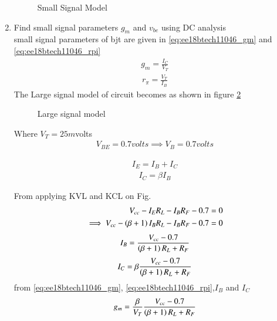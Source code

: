 \begin{enumerate}[label=\arabic*.,ref=\theenumi]
\begin{figure}[ht!]
	\begin{center}
		\resizebox{\columnwidth}{!}{}
	\end{center}
	\caption{Small Signal Model}
	\label{fig:ee18btech11046_smallSig}
\end{figure}
\renewcommand{\thefigure}{\theenumi}
%
\item Find small signal parameters 
 $g_{m}$ and $v_{be}$ using DC analysis
\\
%
\solution
small signal parameters of bjt are given in
\eqref{eq:ee18btech11046_gm} and \eqref{eq:ee18btech11046_rpi}
\begin{align}
g_{m} = \frac{I_{C}}{V_{T}}
\label{eq:ee18btech11046_gm}
\end{align}
\begin{align}
r_{\pi} = \frac{V_{T}}{I_{B}}
\label{eq:ee18btech11046_rpi}
\end{align}
The Large signal model of circuit becomes as shown in figure \ref{fig:ee18btech11046_largeSig}
\begin{figure}[ht!]
	\begin{center}
		\resizebox{\columnwidth}{!}{}
	\end{center}
	\caption{Large signal model}
	\label{fig:ee18btech11046_largeSig}
\end{figure}
\renewcommand{\thefigure}{\theenumi}

Where $V_{T} = 25m$volts
\begin{align}
V_{BE} = 0.7 volts 
\implies
V_{B} = 0.7 volts
\end{align}

\begin{align}
I_{E} = I_{B} + I_{C}
\end{align}
\begin{align}
I_{C} = \beta I_{B}
\end{align}

From applying KVL and KCL on Fig.
\begin{align}
V_{cc} - I_{E}R_{L} - I_{B}R_{F} - 0.7 = 0
\\
\implies
V_{cc} - \left(\beta+1\right)I_{B}R_{L} - I_{B}R_{F} - 0.7 = 0
\end{align}
\begin{align}
I_{B} = \frac{V_{cc}-0.7}{\left(\beta+1\right)R_{L}+R_{F}}
\label{eq:ee18btech11046_IB}
\end{align}
\begin{align}
I_{C} = \beta \frac{V_{cc}-0.7}{\left(\beta+1\right)R_{L}+R_{F}}
\label{eq:ee18btech11046_IC}
\end{align}
from \eqref{eq:ee18btech11046_gm}, \eqref{eq:ee18btech11046_rpi},$I_{B}$ and $I_{C}$
\begin{align}
g_{m} = \frac{\beta}{V_{T}}\frac{V_{cc}-0.7}{\left(\beta+1\right)R_{L}+R_{F}}
\label{eq:ee18btech11046_gmval}
\end{align}


\end{enumerate}
